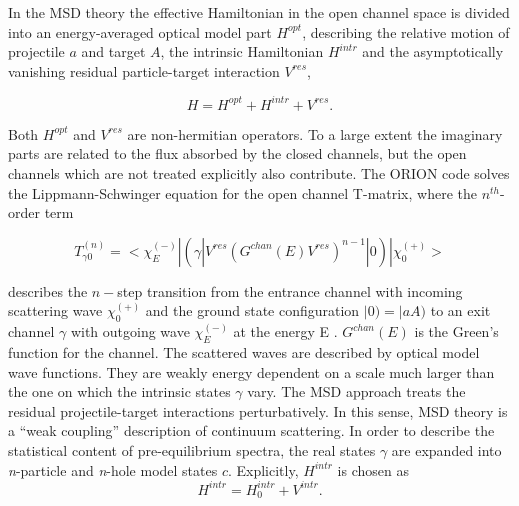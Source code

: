 In the MSD%
 theory the effective Hamiltonian in the open channel space is
divided into an energy-averaged optical model part $H^{opt}$, describing the
relative motion of projectile $a$ and target $A$, the intrinsic Hamiltonian $%
H^{intr}$ and the asymptotically vanishing residual particle-target
interaction $V^{res}$,

\begin{equation}
H=H^{opt}+H^{intr}+V^{res}.  \label{fullh}
\end{equation}

\noindent Both $H^{opt}$ and $V^{res}$ are non-hermitian operators. To a
large extent the imaginary parts are related to the flux absorbed by the
closed channels, but the open channels which are not treated explicitly
also contribute. The ORION code solves the Lippmann-Schwinger equation
for the open channel T-matrix, where the $n^{th}$-order term

\begin{equation}
T_{\gamma0}^{(n)}=<\chi_{E}^{(-)}|(%
\gamma|V^{res}(G^{chan}(E)V^{res})^{n-1}|0)|\chi_{0}^{(+)}>  \label{tgamman}
\end{equation}

\noindent describes the $n-$step transition from the entrance channel with
incoming scattering wave $\chi_{0}^{(+)}$ and the ground state configuration
$|0)=|aA)$ to an exit channel $\gamma$ with outgoing wave $\chi_{E}^{(-)}$
at the energy E \cite{SLW,LW92}. $G^{chan}(E)$ is the Green's function for
the channel. The scattered waves are described by
optical model wave functions. They are
weakly energy dependent on a scale much larger than the one on which the
intrinsic states $\gamma$ vary. The MSD approach treats the residual
projectile-target interactions perturbatively. In this sense, MSD theory is
a {}``weak coupling'' description of continuum scattering. In order to
describe the statistical content of pre-equilibrium spectra, the real states $%
\gamma$ are expanded into \emph{n}-particle and \emph{n}-hole model states $%
c $. Explicitly, $H^{intr}$ is chosen as
\begin{equation}
H^{intr}=H_{0}^{intr}+V^{intr}.  \label{hintr}
\end{equation}

